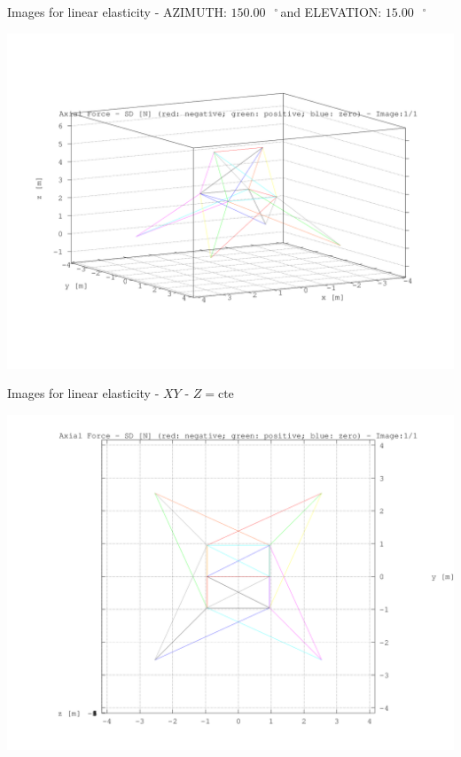 \documentclass[a4paper,11pt]{article}
\newcommand{\grad}{\hspace{-2.5mm}$\,\phantom{a}^{\circ}\,$}
\begin{document}
\newpage       
\begin{center}       
Images for linear elasticity - AZIMUTH: $150.00$\grad and ELEVATION: $ 15.00$\grad

\includegraphics[width=.80\textwidth]{../torre_axial_force_1.png}      

\end{center}       
\newpage       
\begin{center}       
Images for linear elasticity -  $XY$ - $Z=\text{cte}$ 

\includegraphics[width=.80\textwidth]{../../XY_XZ_YZ/XY/axial_force/torre_axial_force_XY_1.png}      

\end{center}       
\newpage       
\end{document}
